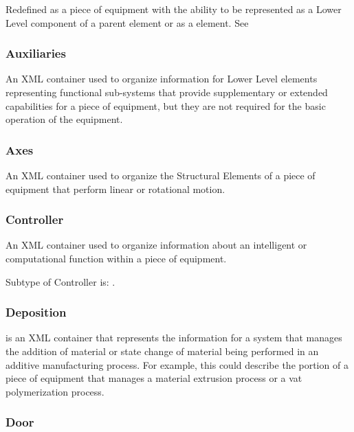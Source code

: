 Redefined as a piece of equipment with the ability to be represented as a \gls{Lower Level} component of a parent  element or as a  element. See 

\FloatBarrier

\subsubsection{Auxiliaries}
  \label{sec:Auxiliaries}


An XML container used to organize information for \gls{Lower Level} elements representing functional sub-systems that provide supplementary or extended capabilities for a piece of equipment, but they are not required for the basic operation of the equipment.

\FloatBarrier

\subsubsection{Axes}
  \label{sec:Axes}


An XML container used to organize the \gls{Structural Elements} of a piece of equipment that perform linear or rotational motion.

\FloatBarrier

\subsubsection{Controller}
  \label{sec:Controller}


An XML container used to organize information about an intelligent or computational function within a piece of equipment.


Subtype of Controller is: .
\FloatBarrier

\subsubsection{Deposition}
  \label{sec:Deposition}


 is an XML container that represents the information for a system that manages the addition of material or state change of material being performed in an additive manufacturing process.  For example, this could describe the portion of a piece of equipment that manages a material extrusion process or a vat polymerization process.

\FloatBarrier

\subsubsection{Door}
  \label{sec:Door}


